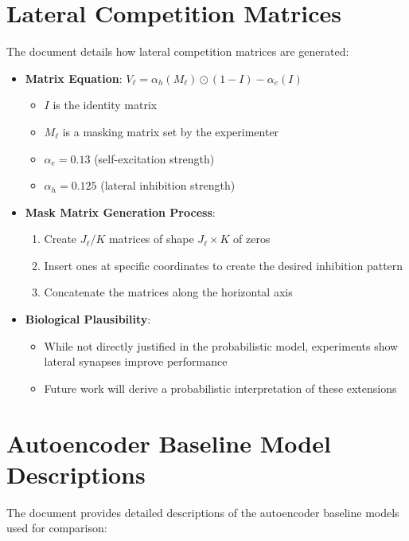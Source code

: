 \documentclass{article}
\begin{document}
\section{Lateral Competition Matrices}

The document details how lateral competition matrices are generated:

\begin{itemize}
  \item \textbf{Matrix Equation}: $V_\ell = \alpha_h(M_\ell) \odot (1-I) - \alpha_e(I)$
  \begin{itemize}
    \item $I$ is the identity matrix
    \item $M_\ell$ is a masking matrix set by the experimenter
    \item $\alpha_e = 0.13$ (self-excitation strength)
    \item $\alpha_h = 0.125$ (lateral inhibition strength)
  \end{itemize}

  \item \textbf{Mask Matrix Generation Process}:
  \begin{enumerate}
    \item Create $J_\ell/K$ matrices of shape $J_\ell \times K$ of zeros
    \item Insert ones at specific coordinates to create the desired inhibition pattern
    \item Concatenate the matrices along the horizontal axis
  \end{enumerate}

  \item \textbf{Biological Plausibility}:
  \begin{itemize}
    \item While not directly justified in the probabilistic model, experiments show lateral synapses improve performance
    \item Future work will derive a probabilistic interpretation of these extensions
  \end{itemize}
\end{itemize}

\section{Autoencoder Baseline Model Descriptions}

The document provides detailed descriptions of the autoencoder baseline models used for comparison:
\end{document}

